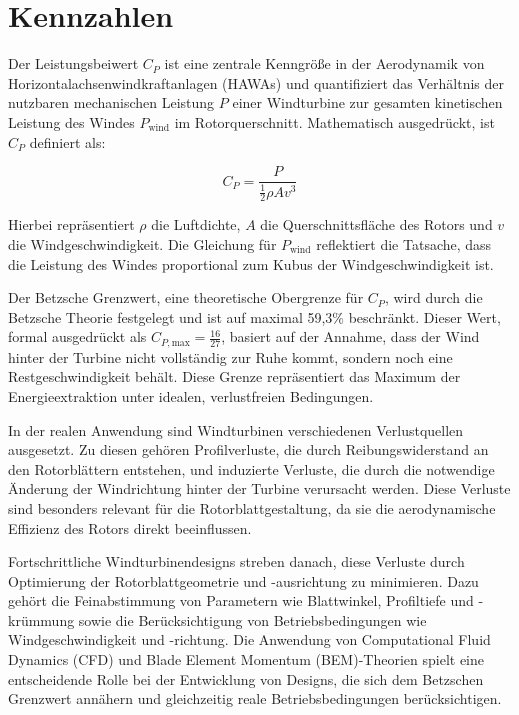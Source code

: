 \section{Kennzahlen}
Der Leistungsbeiwert \( C_P \) ist eine zentrale Kenngröße in der Aerodynamik von Horizontalachsenwindkraftanlagen (HAWAs) und quantifiziert das Verhältnis der nutzbaren mechanischen Leistung \( P \) einer Windturbine zur gesamten kinetischen Leistung des Windes \( P_{\text{wind}} \) im Rotorquerschnitt. Mathematisch ausgedrückt, ist \( C_P \) definiert als:

\begin{equation}
C_P = \frac{P}{\frac{1}{2} \rho A v^3}
\end{equation}

Hierbei repräsentiert \( \rho \) die Luftdichte, \( A \) die Querschnittsfläche des Rotors und \( v \) die Windgeschwindigkeit. Die Gleichung für \( P_{\text{wind}} \) reflektiert die Tatsache, dass die Leistung des Windes proportional zum Kubus der Windgeschwindigkeit ist.

Der Betzsche Grenzwert, eine theoretische Obergrenze für \( C_P \), wird durch die Betzsche Theorie festgelegt und ist auf maximal 59,3\% beschränkt. Dieser Wert, formal ausgedrückt als \( C_{P, \text{max}} = \frac{16}{27} \), basiert auf der Annahme, dass der Wind hinter der Turbine nicht vollständig zur Ruhe kommt, sondern noch eine Restgeschwindigkeit behält.
Diese Grenze repräsentiert das Maximum der Energieextraktion unter idealen, verlustfreien Bedingungen.

In der realen Anwendung sind Windturbinen verschiedenen Verlustquellen ausgesetzt. Zu diesen gehören Profilverluste, die durch Reibungswiderstand an den Rotorblättern entstehen, und induzierte Verluste, die durch die notwendige Änderung der Windrichtung hinter der Turbine verursacht werden. Diese Verluste sind besonders relevant für die Rotorblattgestaltung, da sie die aerodynamische Effizienz des Rotors direkt beeinflussen.

Fortschrittliche Windturbinendesigns streben danach, diese Verluste durch Optimierung der Rotorblattgeometrie und -ausrichtung zu minimieren. Dazu gehört die Feinabstimmung von Parametern wie Blattwinkel, Profiltiefe und -krümmung sowie die Berücksichtigung von Betriebsbedingungen wie Windgeschwindigkeit und -richtung. Die Anwendung von Computational Fluid Dynamics (CFD) und Blade Element Momentum (BEM)-Theorien spielt eine entscheidende Rolle bei der Entwicklung von Designs, die sich dem Betzschen Grenzwert annähern und gleichzeitig reale Betriebsbedingungen berücksichtigen.

